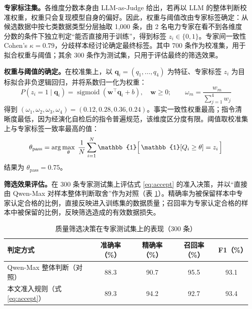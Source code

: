 \documentclass[fontset=fandol,type=master,campus=shenzhen,etitleauto=true]{hithesisbook}
\begin{document}
\textbf{专家标注集。}各维度分数本身由 LLM-as-Judge 给出，若再以 LLM 的整体判断校准权重，权重只会复现模型自身的偏好。因此，权重与阈值改由专家标签确定：从候选数据中按七类数据类型分层抽取 1,000 条，由 2 名电力专家在看不到各维度分数的条件下独立判定“能否直接用于训练”，得到标签 $z_i \in \{0, 1\}$。专家间一致性 Cohen's $\kappa = 0.79$，分歧样本经讨论确定最终标签。其中 700 条作为校准集，用于拟合权重与阈值；其余 300 条作为测试集，只用于评估最终的筛选效果。

\textbf{权重与阈值的确定。}在校准集上，以 $\mathbf{q}_i = (q_1, \ldots, q_4)$ 为特征、专家标签 $z_i$ 为目标拟合非负逻辑回归，并将系数归一化为权重：
\begin{equation}\label{eq:weight-calib}
P(z_i = 1 \mid \mathbf{q}_i) = \operatorname{sigmoid}(\mathbf{w}^\top \mathbf{q}_i + b), \quad \mathbf{w} \ge 0; \qquad
\omega_m = \frac{w_m}{\sum_{j=1}^{4} w_j}
\end{equation}
得到 $(\omega_1, \omega_2, \omega_3, \omega_4) = (0.12, 0.28, 0.36, 0.24)$。事实一致性权重最高；指令清晰度最低，因为经演化自检后的指令普遍规范，该维度区分度有限。阈值取校准集上与专家标签一致率最高的值：
\begin{equation}\label{eq:theta-pass}
\theta_{\text{pass}} = \arg\max_{\theta} \; \frac{1}{N} \sum_{i=1}^{N} \mathbb{1}\Bigl[\, \mathbb{1}[Q_i \ge \theta] = z_i \,\Bigr]
\end{equation}
结果为 $\theta_{\text{pass}} = 0.75$。

\textbf{筛选效果评估。}在 300 条专家测试集上评估式 \eqref{eq:accept} 的准入决策，并以“直接由 Qwen-Max 对样本整体判断取舍”作为对照（表 \ref{tab:quality-gold}）。精确率为被保留样本中专家认定合格的比例，直接反映进入训练集的数据质量；召回率为专家认定合格的样本中被保留的比例，反映筛选造成的有效数据损失。

\begin{table}[htbp]
\centering
\caption{质量筛选决策在专家测试集上的表现（300 条）}
\label{tab:quality-gold}
\small
\renewcommand{\arraystretch}{1.15}
\begin{tabular}{l c c c c}
\toprule
\textbf{判定方式} & \textbf{准确率（\%）} & \textbf{精确率（\%）} & \textbf{召回率（\%）} & \textbf{F1（\%）} \\
\midrule
Qwen-Max 整体判断（对照） & 88.3 & 90.7 & 95.5 & 93.1 \\
本文准入规则（式 \eqref{eq:accept}） & 89.3 & 94.2 & 92.7 & 93.4 \\
\bottomrule
\end{tabular}
\end{table}
\end{document}
